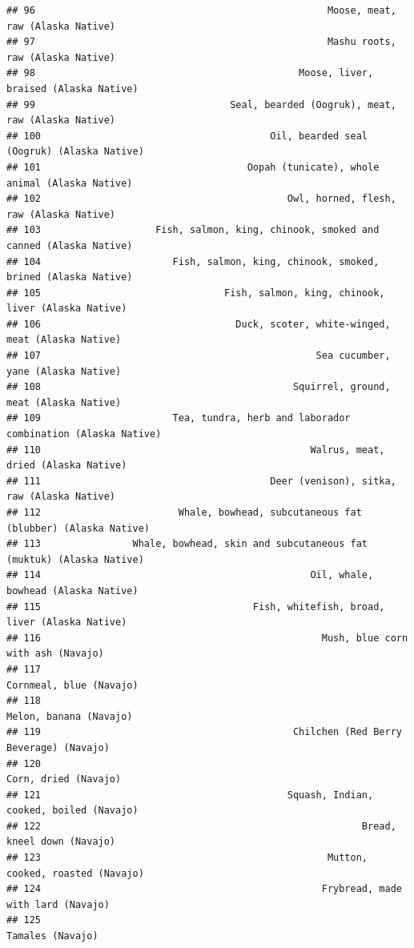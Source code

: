 \documentclass[
]{article}
\begin{document}
\begin{verbatim}
## 96                                                   Moose, meat, raw (Alaska Native)
## 97                                                   Mashu roots, raw (Alaska Native)
## 98                                              Moose, liver, braised (Alaska Native)
## 99                                  Seal, bearded (Oogruk), meat, raw (Alaska Native)
## 100                                        Oil, bearded seal (Oogruk) (Alaska Native)
## 101                                    Oopah (tunicate), whole animal (Alaska Native)
## 102                                           Owl, horned, flesh, raw (Alaska Native)
## 103                    Fish, salmon, king, chinook, smoked and canned (Alaska Native)
## 104                       Fish, salmon, king, chinook, smoked, brined (Alaska Native)
## 105                                Fish, salmon, king, chinook, liver (Alaska Native)
## 106                                  Duck, scoter, white-winged, meat (Alaska Native)
## 107                                                Sea cucumber, yane (Alaska Native)
## 108                                            Squirrel, ground, meat (Alaska Native)
## 109                       Tea, tundra, herb and laborador combination (Alaska Native)
## 110                                               Walrus, meat, dried (Alaska Native)
## 111                                        Deer (venison), sitka, raw (Alaska Native)
## 112                        Whale, bowhead, subcutaneous fat (blubber) (Alaska Native)
## 113                Whale, bowhead, skin and subcutaneous fat (muktuk) (Alaska Native)
## 114                                               Oil, whale, bowhead (Alaska Native)
## 115                                     Fish, whitefish, broad, liver (Alaska Native)
## 116                                                 Mush, blue corn with ash (Navajo)
## 117                                                           Cornmeal, blue (Navajo)
## 118                                                            Melon, banana (Navajo)
## 119                                            Chilchen (Red Berry Beverage) (Navajo)
## 120                                                              Corn, dried (Navajo)
## 121                                           Squash, Indian, cooked, boiled (Navajo)
## 122                                                        Bread, kneel down (Navajo)
## 123                                                  Mutton, cooked, roasted (Navajo)
## 124                                                 Frybread, made with lard (Navajo)
## 125                                                                  Tamales (Navajo)

\end{verbatim}
\end{document}
